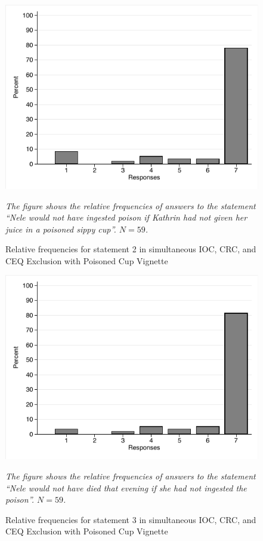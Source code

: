 \documentclass[egregdoesnotlikesansseriftitles,12pt]{scrartcl}
\begin{document}
\begin{figure}[H]
   \centering
   \includegraphics[scale=0.8]{figures/cup_com_hist_2.pdf}
   \begin{minipage}{0.9\linewidth}
   \footnotesize
   \emph{The figure shows the relative frequencies of answers to the statement ``Nele would not have ingested poison if Kathrin had not given her juice in a poisoned sippy cup''. $N=59$.}
   \end{minipage}
   \caption{Relative frequencies for statement 2 in simultaneous IOC, CRC, and CEQ Exclusion with Poisoned Cup Vignette}
   \label{fig:cup_com_hist_2}
\end{figure}

\begin{figure}[H]
   \centering
   \includegraphics[scale=0.8]{figures/cup_com_hist_3.pdf}
   \begin{minipage}{0.9\linewidth}
   \footnotesize
   \emph{The figure shows the relative frequencies of answers to the statement ``Nele would not have died that evening if she had not ingested the poison''. $N=59$.}
   \end{minipage}
   \caption{Relative frequencies for statement 3 in simultaneous IOC, CRC, and CEQ Exclusion with Poisoned Cup Vignette}
   \label{fig:cup_com_hist_3}
\end{figure}
\end{document}
